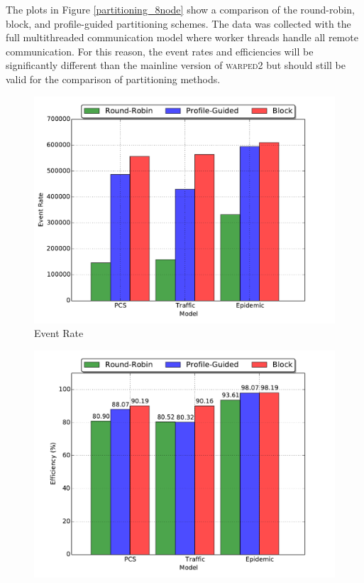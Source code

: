 \documentclass[11pt]{book}
\begin{document}
The plots in Figure \ref{partitioning_8node} show a comparison of the round-robin, block, and
profile-guided partitioning schemes.  The data was collected with the full multithreaded
communication model where worker threads handle all remote communication.  For this reason, the
event rates and efficiencies will be significantly different than the mainline version of
\textsc{warped2} but should still be valid for the comparison of partitioning methods.

\begin{figure}
  \begin{minipage}{.5\textwidth}
    \begin{center}
      \includegraphics[width=\textwidth,keepaspectratio,quiet]{figs/partitioning_communication/partitioning_eventrate_8node.pdf} \\
      Event Rate \\
    \end{center}
  \end{minipage}%
  \hfill
  \begin{minipage}{.5\textwidth}
    \begin{center}
      \includegraphics[width=\textwidth,keepaspectratio,quiet]{figs/partitioning_communication/partitioning_efficiency_8node.pdf} \\

\end{center}
\end{minipage}
\end{figure}
\end{document}
